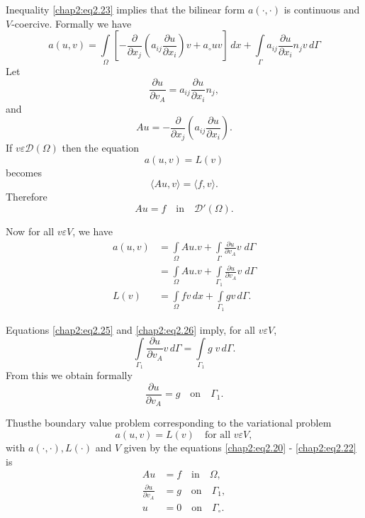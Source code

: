 Inequality \eqref{chap2:eq2.23} implies that the bilinear form
$a(\cdotp,\cdotp)$ is continuous and $V$-coercive. Formally we have 
\begin{equation}\label{chap2:eq2.24}
a(u, v)=\int\limits_\Omega\left[-\frac{\partial}{\partial x_j} \left(a_{ij}
  \frac{\partial u}{\partial x_i}\right)v+a_\circ uv\right]\,dx+
\int\limits_\Gamma a_{ij}\frac{\partial u}{\partial x_i}n_jv\,d\Gamma
\end{equation}\pageoriginale
Let
$$
\frac{\partial u}{\partial v_A}=a_{ij}\frac{\partial u}{\partial x_i}
n_j, 
$$
and
$$
Au= -\frac{\partial}{\partial x_j}\left(a_{ij} \frac{\partial u} {\partial
x_i}\right). 
$$
If $v\varepsilon\mathscr{D}(\Omega)$ then the equation
\begin{equation}\label{chap2:eq2.25}
a(u, v)=L(v)
\end{equation}
becomes
$$
\langle Au, v\rangle= \langle f, v\rangle.
$$
Therefore
\begin{equation}\label{chap2:eq2.26}
Au=f\quad\text{in}\quad\mathscr{D}'(\Omega).
\end{equation}

Now for all $v\varepsilon V$, we have 
\begin{align*}
a(u, v) &= \int\limits_\Omega Au.v+\int\limits_\Gamma \frac{\partial
u}{\partial v_A}v\; d\Gamma\\
&= \int\limits_\Omega Au.v+\int\limits_{\Gamma_1} \frac{\partial u}
{\partial v_A}v\; d\Gamma\\
L(v) &= \int\limits_\Omega fv\,dx +\int\limits_{\Gamma_1} gv\,d\Gamma. 
\end{align*}

Equations \eqref{chap2:eq2.25} and \eqref{chap2:eq2.26} imply, for all
$v\varepsilon V$, 
$$
\int\limits_{\Gamma_1}\frac{\partial u}{\partial v_A}v\, d\Gamma =
\int\limits_{\Gamma_1} g\; v\, d\Gamma.
$$
From this we obtain formally
\begin{equation}\label{chap2:eq2.27}
\frac{\partial u}{\partial v_A}=g\quad\text{on}\quad\Gamma_1.
\end{equation}

Thus\pageoriginale the boundary value problem corresponding to the
variational problem
$$
a(u, v)=L(v)\quad\text{for all } v\varepsilon V,
$$
with $a(\cdotp,\cdotp), L(\cdotp)$ and $V$ given by the equations
\eqref{chap2:eq2.20} - \eqref{chap2:eq2.22} is
\begin{equation}\label{chap2:eq2.28}
\begin{split}
Au &= f\quad\text{in}\quad\Omega,\\
\frac{\partial u}{\partial v_A} &= g\quad\text{on}\quad\Gamma_1,\\
u &= 0\quad\text{on}\quad\Gamma_\circ.
\end{split}
\end{equation}

